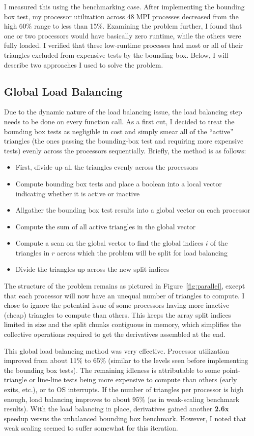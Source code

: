 \documentclass[11pt,letterpaper]{article}
\begin{document}
I measured this using the benchmarking case.
After implementing the bounding box test, my processor utilization across 48 MPI processes decreased from the high 60\% range to less than 15\%.
Examining the problem further, I found that one or two processors would have basically zero runtime, while the others were fully loaded.
I verified that these low-runtime processes had most or all of their triangles excluded from expensive tests by the bounding box.
Below, I will describe two approaches I used to solve the problem.

\subsection{Global Load Balancing}
Due to the dynamic nature of the load balancing issue, the load balancing step needs to be done on every function call.
As a first cut, I decided to treat the bounding box tests as negligible in cost and simply smear all of the ``active'' triangles (the ones passing the bounding-box test and requiring more expensive tests) evenly across the processors sequentially.
Briefly, the method is as follows:
\begin{itemize}
\item First, divide up all the triangles evenly across the processors
\item Compute bounding box tests and place a boolean into a local vector indicating whether it is active or inactive
\item Allgather the bounding box test results into a global vector on each processor
\item Compute the sum of all active triangles in the global vector
\item Compute a scan on the global vector to find the global indices $i$ of the triangles in $r$ across which the problem will be split for load balancing
\item Divide the triangles up across the new split indices
\end{itemize}
The structure of the problem remains as pictured in Figure~\ref{fig:parallel}, except that each processor will now have an unequal number of triangles to compute.
I chose to ignore the potential issue of some processors having more inactive (cheap) triangles to compute than others.
This keeps the array split indices limited in size and the split chunks contiguous in memory, which simplifies the collective operations required to get the derivatives assembled at the end.

This global load balancing method was very effective.
Processor utilization improved from about 11\% to 65\% (similar to the levels seen before implementing the bounding box tests).
The remaining idleness is attributable to some point-triangle or line-line tests being more expensive to compute than others (early exits, etc.), or to OS interrupts.
If the number of triangles per processor is high enough, load balancing improves to about 95\% (as in weak-scaling benchmark results).
With the load balancing in place, derivatives gained another \textbf{2.6x} speedup versus the unbalanced bounding box benchmark.
However, I noted that weak scaling seemed to suffer somewhat for this iteration.
\end{document}
